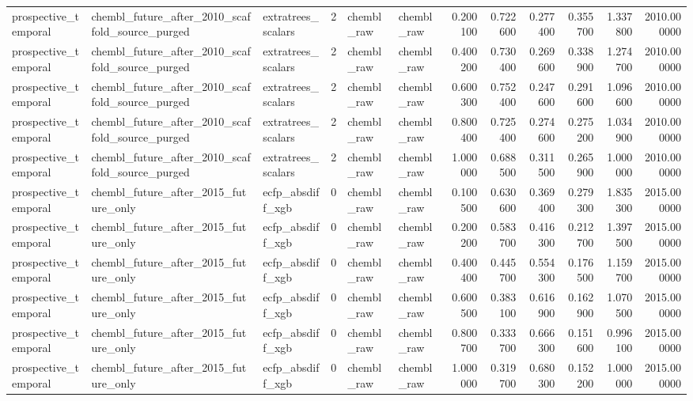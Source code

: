 \begin{longtable}{lllrllrrrrrr}
prospective\_temporal & chembl\_future\_after\_2010\_scaffold\_source\_purged & extratrees\_scalars & 2 & chembl\_raw & chembl\_raw & 0.200100 & 0.722600 & 0.277400 & 0.355700 & 1.337800 & 2010.000000 \\
prospective\_temporal & chembl\_future\_after\_2010\_scaffold\_source\_purged & extratrees\_scalars & 2 & chembl\_raw & chembl\_raw & 0.400200 & 0.730400 & 0.269600 & 0.338900 & 1.274700 & 2010.000000 \\
prospective\_temporal & chembl\_future\_after\_2010\_scaffold\_source\_purged & extratrees\_scalars & 2 & chembl\_raw & chembl\_raw & 0.600300 & 0.752400 & 0.247600 & 0.291600 & 1.096600 & 2010.000000 \\
prospective\_temporal & chembl\_future\_after\_2010\_scaffold\_source\_purged & extratrees\_scalars & 2 & chembl\_raw & chembl\_raw & 0.800400 & 0.725400 & 0.274600 & 0.275200 & 1.034900 & 2010.000000 \\
prospective\_temporal & chembl\_future\_after\_2010\_scaffold\_source\_purged & extratrees\_scalars & 2 & chembl\_raw & chembl\_raw & 1.000000 & 0.688500 & 0.311500 & 0.265900 & 1.000000 & 2010.000000 \\
prospective\_temporal & chembl\_future\_after\_2015\_future\_only & ecfp\_absdiff\_xgb & 0 & chembl\_raw & chembl\_raw & 0.100500 & 0.630600 & 0.369400 & 0.279300 & 1.835300 & 2015.000000 \\
prospective\_temporal & chembl\_future\_after\_2015\_future\_only & ecfp\_absdiff\_xgb & 0 & chembl\_raw & chembl\_raw & 0.200200 & 0.583700 & 0.416300 & 0.212700 & 1.397500 & 2015.000000 \\
prospective\_temporal & chembl\_future\_after\_2015\_future\_only & ecfp\_absdiff\_xgb & 0 & chembl\_raw & chembl\_raw & 0.400400 & 0.445700 & 0.554300 & 0.176500 & 1.159700 & 2015.000000 \\
prospective\_temporal & chembl\_future\_after\_2015\_future\_only & ecfp\_absdiff\_xgb & 0 & chembl\_raw & chembl\_raw & 0.600500 & 0.383100 & 0.616900 & 0.162900 & 1.070500 & 2015.000000 \\
prospective\_temporal & chembl\_future\_after\_2015\_future\_only & ecfp\_absdiff\_xgb & 0 & chembl\_raw & chembl\_raw & 0.800700 & 0.333700 & 0.666300 & 0.151600 & 0.996100 & 2015.000000 \\
prospective\_temporal & chembl\_future\_after\_2015\_future\_only & ecfp\_absdiff\_xgb & 0 & chembl\_raw & chembl\_raw & 1.000000 & 0.319700 & 0.680300 & 0.152200 & 1.000000 & 2015.000000 \\

\end{longtable}
